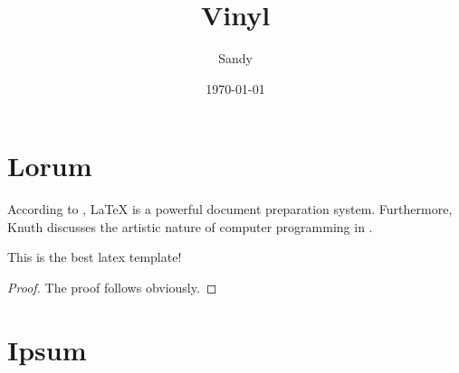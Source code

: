 \documentclass[paper]{vinyl}
\title{Vinyl}
\author{Sandy}
\date{\today}
\begin{document}
\maketitle

\begin{abstract}
	\lipsum[1]
\end{abstract}

\section{Lorum}

According to \cite{lamport1994latex}, LaTeX is a powerful document preparation system.
Furthermore, Knuth discusses the artistic nature of computer programming in \cite{knuth1974computer}.

\lipsum[2-3]

\begin{theorem}
	This is the best latex template!
\end{theorem}
\begin{proof}
	The proof follows obviously.
\end{proof}

\section{Ipsum}

\lipsum[4-16]

\printbibliography
\end{document}
